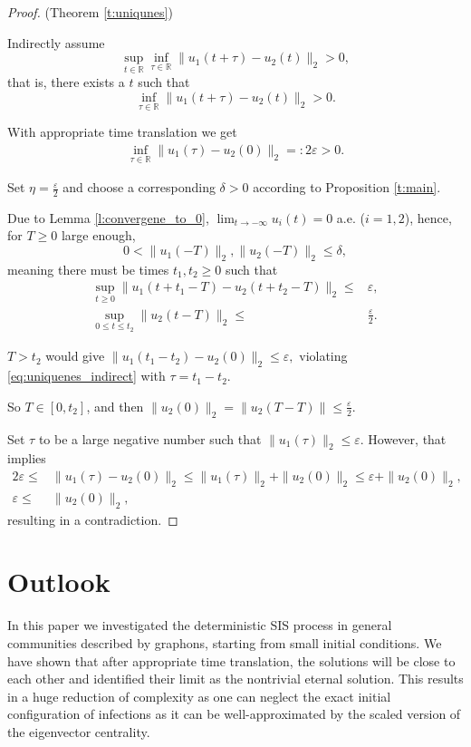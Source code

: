 \documentclass{article}
\newcommand{\1}[1]{{\mathds{1}}_{\left\{#1\right\}}}
\begin{document}
\begin{proof}(Theorem \ref{t:uniqunes})
	
	Indirectly assume
	$$ \sup_{t \in \mathbb{R}} \inf_{\tau \in \mathbb{R}} \|u_1(t+\tau)-u_2(t) \|_2>0,$$
	that is, there exists a $t$ such that
	$$ \inf_{\tau \in \mathbb{R}} \|u_1(t+\tau)-u_2(t) \|_2>0. $$	
	
	With appropriate time translation we get 
	\begin{align}
		\label{eq:uniquenes_indirect}
		\inf_{\tau \in \mathbb{R}} \|u_1(\tau)-u_2(0) \|_2=:2 \varepsilon>0.
	\end{align}
	
	Set $\eta=\frac{\varepsilon}{2}$ and choose a corresponding $\delta>0$ according to Proposition \ref{t:main}.
	
	Due to Lemma \ref{l:convergene_to_0}, $\lim_{t \to -\infty}u_i(t)=0$ a.e. ($i=1,2$), hence, for $T \geq 0$ large enough,
	$$0<\|u_1(-T) \|_2, \|u_2(-T) \|_2 \leq \delta,$$
	meaning there must be times $t_1,t_2 \geq 0$ such that
	\begin{align*}
		\sup_{t \geq 0} \|u_1(t+t_1-T)-u_2(t+t_2-T) \|_2 \leq & \varepsilon, \\
		\sup_{0 \leq t \leq t_2} \|u_2(t-T) \|_2 \leq & \frac{\varepsilon}{2}.
	\end{align*}
	
	$T>t_2$ would give $\|u_1(t_1-t_2)-u_2(0) \|_2 \leq \varepsilon,$ violating \eqref{eq:uniquenes_indirect} with $\tau=t_1-t_2.$
	
	So $T \in [0,t_2]$, and then $\|u_2(0) \|_2=\|u_2(T-T) \| \leq \frac{\varepsilon}{2}. $
	
	Set $\tau$ to be a large negative number such that $\|u_1(\tau) \|_2 \leq \varepsilon.$ However, that implies 
	\begin{align*}
		2 \varepsilon \leq & \|u_1(\tau)-u_2(0) \|_2 \leq \|u_1(\tau) \|_2+\|u_2(0) \|_2 \leq \varepsilon+\|u_2(0) \|_2, \\
		\varepsilon \leq & \|u_2(0) \|_2,
	\end{align*}
	resulting in a contradiction.
\end{proof}



\section{Outlook}

In this paper we investigated the deterministic SIS process in general communities described by graphons, starting from small initial conditions. We have shown that after appropriate time translation, the solutions will be close to each other and identified their limit as the nontrivial eternal solution. This results in a huge reduction of complexity as one can neglect the exact initial configuration of infections as it can be well-approximated by the scaled version of the eigenvector centrality.
\end{document}
